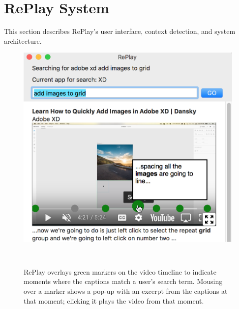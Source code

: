 \section{RePlay System}
This section describes RePlay's user interface, context detection, and system architecture.

\begin{figure}[b!]
\centering
\vspace{-0.2in}
  \includegraphics[width=\textwidth]{replay/figures/green_markers.png}
  \caption{RePlay overlays green markers on the video timeline to indicate moments where the captions match a user's search term. Mousing over a marker shows a pop-up with an excerpt from the captions at that moment; clicking it plays the video from that moment. }~\label{fig:replay-green_markers}
  \vspace{-0.2in}
\end{figure}

